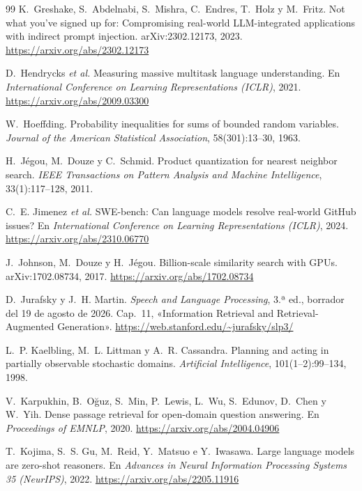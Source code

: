 \begin{thebibliography}{99}
K.~Greshake, S.~Abdelnabi, S.~Mishra, C.~Endres, T.~Holz y M.~Fritz.
\newblock Not what you've signed up for: Compromising real-world LLM-integrated applications with indirect prompt injection.
\newblock arXiv:2302.12173, 2023.
\newblock \url{https://arxiv.org/abs/2302.12173}

D.~Hendrycks \emph{et al.}
\newblock Measuring massive multitask language understanding.
\newblock En \emph{International Conference on Learning Representations (ICLR)}, 2021.
\newblock \url{https://arxiv.org/abs/2009.03300}

W.~Hoeffding.
\newblock Probability inequalities for sums of bounded random variables.
\newblock \emph{Journal of the American Statistical Association}, 58(301):13--30, 1963.

H.~Jégou, M.~Douze y C.~Schmid.
\newblock Product quantization for nearest neighbor search.
\newblock \emph{IEEE Transactions on Pattern Analysis and Machine Intelligence}, 33(1):117--128, 2011.

C.~E. Jimenez \emph{et al.}
\newblock SWE-bench: Can language models resolve real-world GitHub issues?
\newblock En \emph{International Conference on Learning Representations (ICLR)}, 2024.
\newblock \url{https://arxiv.org/abs/2310.06770}

J.~Johnson, M.~Douze y H.~Jégou.
\newblock Billion-scale similarity search with GPUs.
\newblock arXiv:1702.08734, 2017.
\newblock \url{https://arxiv.org/abs/1702.08734}

D.~Jurafsky y J.~H. Martin.
\newblock \emph{Speech and Language Processing}, 3.ª ed., borrador del 19 de agosto de 2026.
\newblock Cap.~11, «Information Retrieval and Retrieval-Augmented Generation».
\newblock \url{https://web.stanford.edu/~jurafsky/slp3/}

L.~P. Kaelbling, M.~L. Littman y A.~R. Cassandra.
\newblock Planning and acting in partially observable stochastic domains.
\newblock \emph{Artificial Intelligence}, 101(1--2):99--134, 1998.

V.~Karpukhin, B.~Oğuz, S.~Min, P.~Lewis, L.~Wu, S.~Edunov, D.~Chen y W.~Yih.
\newblock Dense passage retrieval for open-domain question answering.
\newblock En \emph{Proceedings of EMNLP}, 2020.
\newblock \url{https://arxiv.org/abs/2004.04906}

T.~Kojima, S.~S. Gu, M.~Reid, Y.~Matsuo e Y.~Iwasawa.
\newblock Large language models are zero-shot reasoners.
\newblock En \emph{Advances in Neural Information Processing Systems 35 (NeurIPS)}, 2022.
\newblock \url{https://arxiv.org/abs/2205.11916}


\end{thebibliography}
